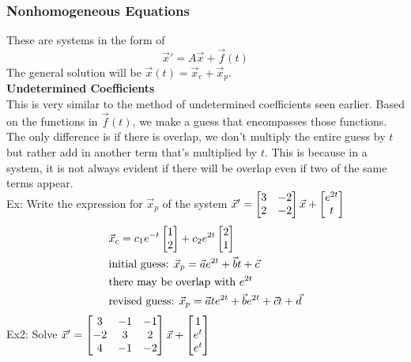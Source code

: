 \documentclass[11pt, fleqn]{article}
\begin{document}
\subsubsection{Nonhomogeneous Equations}
These are systems in the form of
$$\vec{x}'=A\vec{x}+\vec{f}(t)$$
The general solution will be $\vec{x}(t)=\vec{x}_c+\vec{x}_p$.\\

\textbf{Undetermined Coefficients}\\
This is very similar to the method of undetermined coefficients seen earlier. Based on the functions in $\vec{f}(t)$, we make a guess that encompasses those functions. The only difference is if there is overlap, we don't multiply the entire guess by $t$ but rather add in another term that's multiplied by $t$. This is because in a system, it is not always evident if there will be overlap even if two of the same terms appear.\\
Ex: Write the expression for $\vec{x}_p$ of the system $\vec{x}'=\matrixx{3&-2\\2&-2}\vec{x}+\matrixx{e^{2t}\\t}$
\begin{align*}
    &\vec{x}_c=c_1e^{-t}\matrixx{1\\2}+c_2e^{2t}\matrixx{2\\1}\\
    &\text{initial guess: }\vec{x}_p=\vec{a} e^{2t}+\vec{b} t+\vec{c}\\
    &\text{there may be overlap with }e^{2t}\\
    &\text{revised guess: }\vec{x}_p=\vec{a} te^{2t}+\vec{b} e^{2t}+\vec{c} t+\vec{d}
\end{align*}
Ex2: Solve $\vec{x}'=\matrixx{3&-1&-1\\-2&3&2\\4&-1&-2}\vec{x}+\matrixx{1\\e^t\\e^t}$
\end{document}
